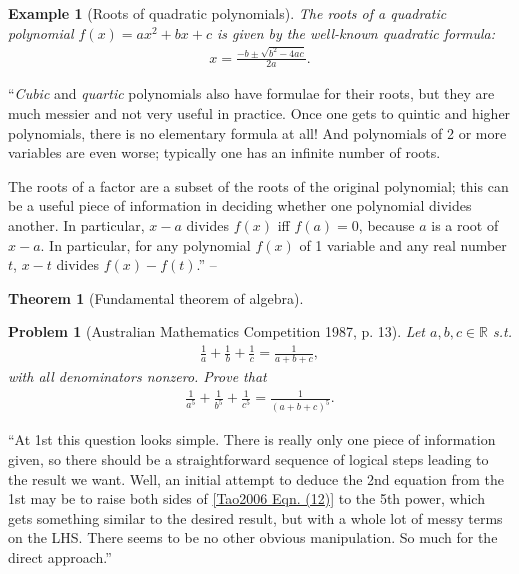 \documentclass{article}
\numberwithin{equation}{section}
\newtheorem{theorem}{Theorem}[section]
\newtheorem{example}{Example}[section]
\newtheorem{problem}{Problem}[section]
\begin{document}
\begin{example}[Roots of quadratic polynomials]
	The roots of a quadratic polynomial $f(x) = ax^2 + bx + c$ is given by the well-known \emph{quadratic formula}:
	\begin{align}
		x = \frac{-b\pm\sqrt{b^2 - 4ac}}{2a}.
	\end{align}
\end{example}
``\textit{Cubic} and \textit{quartic} polynomials also have formulae for their roots, but they are much messier and not very useful in practice. Once one gets to quintic and higher polynomials, there is no elementary formula at all! And polynomials of 2 or more variables are even worse; typically one has an infinite number of roots.

The roots of a factor are a subset of the roots of the original polynomial; this can be a useful piece of information in deciding whether one polynomial divides another. In particular, $x - a$ divides $f(x)$ iff $f(a) = 0$, because $a$ is a root of $x - a$. In particular, for any polynomial $f(x)$ of 1 variable and any real number $t$, $x - t$ divides $f(x) - f(t)$.'' -- \cite[p. 42]{Tao2006}

\begin{theorem}[Fundamental theorem of algebra]
	
\end{theorem}

\begin{problem}[Australian Mathematics Competition 1987, p. 13]
	Let $a,b,c\in\mathbb{R}$ s.t.
	\begin{align}
		\label{Tao2006 Eqn. (12)}
		\frac{1}{a} + \frac{1}{b} + \frac{1}{c} = \frac{1}{a + b + c},
	\end{align}
	with all denominators nonzero. Prove that
	\begin{align*}
		\frac{1}{a^5} + \frac{1}{b^5} + \frac{1}{c^5} = \frac{1}{(a + b + c)^5}.
	\end{align*}
\end{problem}
``At 1st this question looks simple. There is really only one piece of information given, so there should be a straightforward sequence of logical steps leading to the result we want. Well, an initial attempt to deduce the 2nd equation from the 1st may be to raise both sides of \eqref{Tao2006 Eqn. (12)} to the 5th power, which gets something similar to the desired result, but with a whole lot of messy terms on the LHS. There seems to be no other obvious manipulation. So much for the direct approach.''
\end{document}
